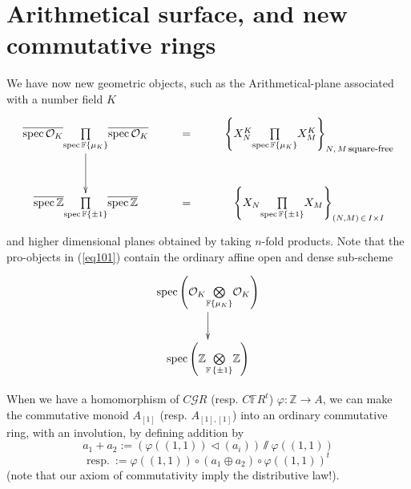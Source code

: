\documentclass[leqno]{article}
\numberwithin{equation}{section}
\begin{document}
\section{Arithmetical surface, and new commutative rings}

We have now new geometric objects, such as the Arithmetical-plane associated with a number field $K$
\begin{equation}
\label{eq101}
\xymatrix{
\overline{{\rm spec} \, {\mathcal O}_K} \underset{{\rm spec} \, {\mathbb F} \{\mu_K \}}{\prod} \overline{{\rm spec} \, {\mathcal O}_K} \ar[d] &= &\left\{ X_N^K \underset{{\rm spec} \, {\mathbb F} \{\mu_K \}}{\prod} X_M^K \right\}_{N, \, M \, \mbox{\footnotesize square-free}}  \\
\overline{{\rm spec} \, {\mathbb Z}} \underset{{\rm spec} \, {\mathbb F} \{\pm 1 \}}{\prod} \overline{{\rm spec} \, {\mathbb Z}} &= &\left\{ X_N \underset{{\rm spec} \, {\mathbb F} \{\pm 1 \}}{\prod} X_M \right\}_{(N,M) \, \in \, I \times I}
}
\end{equation}
and higher dimensional planes obtained by taking $n$-fold products. Note that the pro-objects in (\ref{eq101}) contain the ordinary affine open and dense sub-scheme
\begin{equation}
\label{eq102}
\xymatrix{
{\rm spec} \left( {\mathcal O}_K \underset{{\mathbb F} \{\mu_K \}}{\bigotimes} {\mathcal O}_K \right) \ar[d] \\
{\rm spec} \left( {\mathbb Z} \underset{{\mathbb F} \, \{ \pm 1 \}}{\bigotimes} {\mathbb Z} \right)
}
\end{equation}

When we have a homomorphism of $C{\mathcal G} R$ (resp. $C{\mathbb F} R^t$) $\varphi : {\mathbb Z} \to A$, we can make the commutative monoid $A_{[1]}$ (resp. $A_{[1],[1]}$) into an ordinary commutative ring, with an involution, by defining addition by
\begin{equation}
\label{eq103}
a_1 + a_2 := (\varphi ((1,1)) \lhd (a_i)) \sslash \varphi ((1,1))
\end{equation}
$$
\mbox{resp.} \ := \varphi ((1,1)) \circ (a_1 \oplus a_2) \circ \varphi ((1,1))^t
$$
(note that our axiom of commutativity imply the distributive law!).

\smallskip
\end{document}

